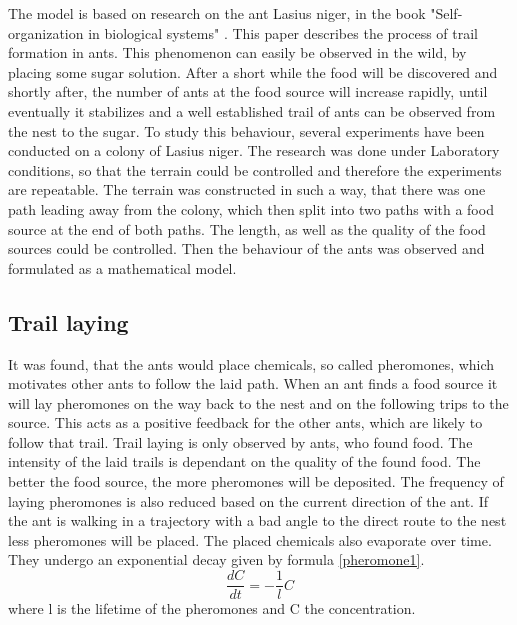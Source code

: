 The model is based on research on the ant Lasius niger, in the book "Self-organization in biological systems" \citep{camazine2003}. This paper describes the process of trail formation in ants. This phenomenon can easily be observed in the wild, by placing some sugar solution. After a short while the food will be discovered and shortly after, the number of ants at the food source will increase rapidly, until eventually it stabilizes and a well established trail of ants can be observed from the nest to the sugar. To study this behaviour, several experiments have been conducted on a colony of Lasius niger. The research was done under Laboratory conditions, so that the terrain could be controlled and therefore the experiments are repeatable. The terrain was constructed in such a way, that there was one path leading away from the colony, which then split into two paths with a food source at the end of both paths. The length, as well as the quality of the food sources could be controlled. Then the behaviour of the ants was observed and formulated as a mathematical model.
\subsection{Trail laying}
 It was found, that the ants would place chemicals, so called pheromones, which motivates other ants to follow the laid path. When an ant finds a food source it will lay pheromones on the way back to the nest and on the following trips to the source. This acts as a positive feedback for the other ants, which are likely to follow that trail. Trail laying is only observed by ants, who found food. The intensity of the laid trails is dependant on the quality of the found food. The better the food source, the more pheromones will be deposited. The frequency of laying pheromones is also reduced based on the current direction of the ant. If the ant is walking in a trajectory with a bad angle to the direct route to the nest less pheromones will be placed. The placed chemicals also evaporate over time. They undergo an exponential decay given by formula \ref{pheromone1}.
 \begin{equation} \label{pheromone1}
  \frac{dC}{dt}=-\frac{1}{l}C
 \end{equation}
 where l is the lifetime of the pheromones and C the concentration.
